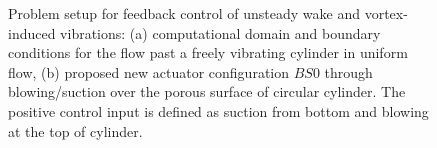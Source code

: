 \documentclass[standard]{jfm}
\begin{document}
\begin{figure}
 \centering
    
  \begin{subfigure}[b]{0.495\textwidth}
    \centering
    \usebox{\largestimage}
    \caption{}
   \label{fig:cylinder}  
  \end{subfigure}
  \begin{subfigure}[b]{0.495\textwidth}
    \centering
    \caption{}
  \label{fig:blowing_suction}  
  \end{subfigure}
  \caption{Problem setup for feedback control of unsteady wake and vortex-induced vibrations: 
           (a) computational domain and boundary conditions for 
           the flow past a freely vibrating cylinder in uniform flow,
           (b) proposed new actuator configuration $BS0$
           through blowing/suction over the porous surface of circular cylinder. 
           The positive control input is defined as 
           suction from bottom and blowing at the top of cylinder. 
}
\label{fig:cylinder_suction}          
\end{figure}


\end{document}
